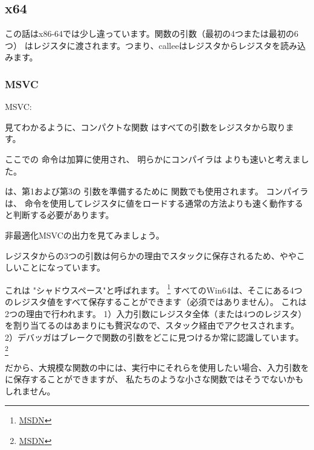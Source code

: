\subsection{x64}


この話はx86-64では少し違っています。関数の引数（最初の4つまたは最初の6つ）
はレジスタに渡されます。つまり、\gls{callee}はレジスタからレジスタを読み込みます。

\subsubsection{MSVC}

\Optimizing MSVC:



見てわかるように、コンパクトな関数 \ttf はすべての引数をレジスタから取ります。

ここでの \LEA 命令は加算に使用され、
明らかにコンパイラは  よりも速いと考えました。

\LEA は、第1および第3の \ttf 引数を準備するために \main 関数でも使用されます。
コンパイラは、 \MOV 命令を使用してレジスタに値をロードする通常の方法よりも速く動作すると判断する必要があります。

非最適化MSVCの出力を見てみましょう。



レジスタからの3つの引数は何らかの理由でスタックに保存されるため、ややこしいことになっています。

\label{shadow_space}
これは "シャドウスペース"と呼ばれます。
\footnote{\href{http://msdn.microsoft.com/en-us/library/zthk2dkh(v=vs.80).aspx}{MSDN}}
すべてのWin64は、そこにある4つのレジスタ値をすべて保存することができます（必須ではありません）。
これは2つの理由で行われます。
1）入力引数にレジスタ全体（または4つのレジスタ）を割り当てるのはあまりにも贅沢なので、スタック経由でアクセスされます。 
2）デバッガはブレークで関数の引数をどこに見つけるか常に認識しています。
\footnote{\href{http://msdn.microsoft.com/en-us/library/ew5tede7(v=VS.90).aspx}{MSDN}}

だから、大規模な関数の中には、実行中にそれらを使用したい場合、入力引数を に保存することができますが、
私たちのような小さな関数ではそうでないかもしれません。

